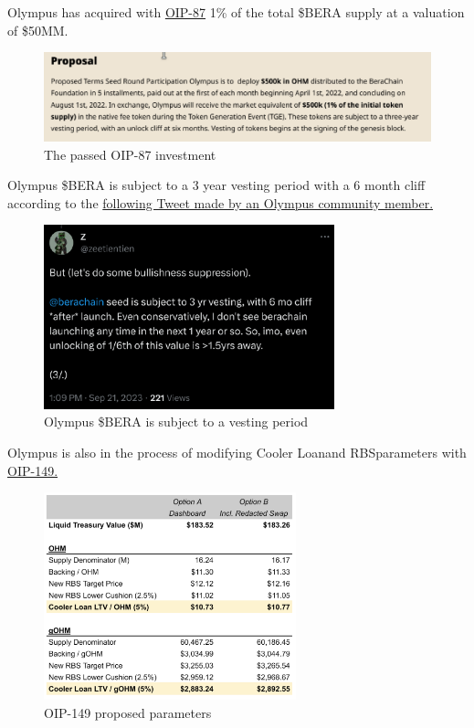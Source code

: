 \documentclass{article}
\begin{document}
Olympus has acquired with \href{https://forum.olympusdao.finance/d/1127-oip-87-berachain-investment-strategic-partnership}{OIP-87} 1\% of the total \$BERA supply at a valuation of \$50MM.

\begin{figure}[h]
    \centering
    \includegraphics[width=1\textwidth]{bera.png}
    \caption{The passed OIP-87 investment}
\end{figure}


Olympus \$BERA is subject to a 3 year vesting period with a 6 month cliff according to the \href{https://x.com/zeetientien/status/1704845265956438046?s=20}{following Tweet made by an Olympus community member.}

\newpage

\begin{figure}[h]
    \centering
    \includegraphics[width=0.75\textwidth]{vesting.png}
    \caption{Olympus \$BERA is subject to a vesting period}
\end{figure}

Olympus is also in the process of modifying Cooler Loan\footnotemark[1] and RBS\footnotemark[2] parameters with \href{https://forum.olympusdao.finance/d/4048-oip-149-backing-ratification-for-cooler-loans-and-rbs}{OIP-149.}

\begin{figure}[h]
    \centering
    \includegraphics[width=0.65\textwidth]{zpost1.png}
    \caption{OIP-149 proposed parameters}
\end{figure}
\end{document}
